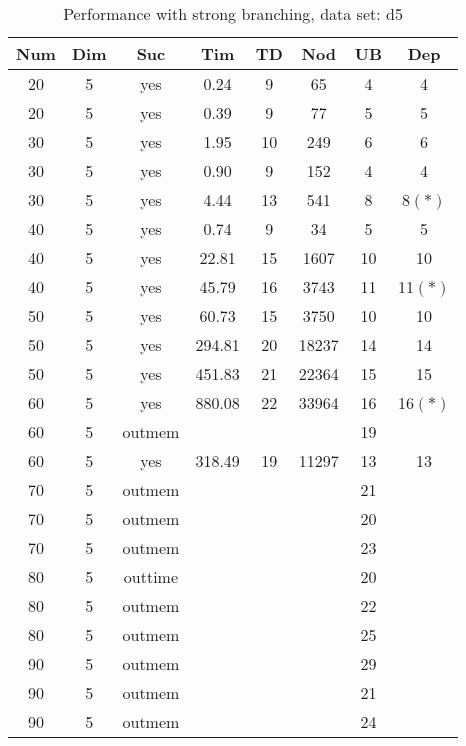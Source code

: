 \begin{table}[!htb]
  \centering
  \begin{tabular}[center]{|c|c|c|c|c|c|c|c|}
    \hline
    Num & Dim & Suc & Tim & TD & Nod & UB & Dep \\
    \hline
    20 & 5 & yes & 0.24 & 9 & 65 & 4 & 4 \\
    20 & 5 & yes & 0.39 & 9 & 77 & 5 & 5 \\
    30 & 5 & yes & 1.95 & 10 & 249 & 6 & 6 \\
    30 & 5 & yes & 0.90 & 9 & 152 & 4 & 4 \\
    30 & 5 & yes & 4.44 & 13 & 541 & 8 & 8$(*)$ \\
    40 & 5 & yes & 0.74 & 9 & 34 & 5 & 5 \\
    40 & 5 & yes & 22.81 & 15 & 1607 & 10 & 10 \\
    40 & 5 & yes & 45.79 & 16 & 3743 & 11 & 11$(*)$ \\
    50 & 5 & yes & 60.73 & 15 & 3750 & 10 & 10 \\
    50 & 5 & yes & 294.81 & 20 & 18237 & 14 & 14 \\
    50 & 5 & yes & 451.83 & 21 & 22364 & 15 & 15 \\
    60 & 5 & yes & 880.08 & 22 & 33964 & 16 & 16$(*)$ \\
    60 & 5 & outmem &&&& 19 &\\
    60 & 5 & yes & 318.49 & 19 & 11297 & 13 & 13 \\
    70 & 5 & outmem &&&& 21 &\\
    70 & 5 & outmem &&&& 20 &\\
    70 & 5 & outmem &&&& 23 &\\
    80 & 5 & outtime &&&& 20 &\\
    80 & 5 & outmem &&&& 22 &\\
    80 & 5 & outmem &&&& 25 &\\
    90 & 5 & outmem &&&& 29 &\\
    90 & 5 & outmem &&&& 21 &\\
    90 & 5 & outmem &&&& 24 &\\
    \hline
  \end{tabular}
  \caption{Performance with strong branching, data set: d5}
  \label{tab:test.bran-d5}
\end{table}

